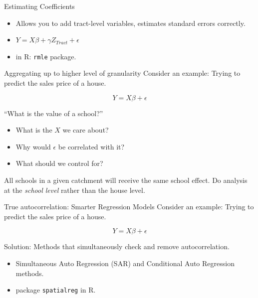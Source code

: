 \documentclass[
  8pt,
  ignorenonframetext,
]{beamer}
\providecommand{\tightlist}{%
  \setlength{\itemsep}{0pt}\setlength{\parskip}{0pt}}
\begin{document}
\begin{frame}[fragile]{Estimating Coefficients}
\begin{itemize}
  \begin{itemize}
  \tightlist
  \item
    Allows you to add tract-level variables, estimates standard errors
    correctly.
  \item
    \(Y = X\beta + \gamma Z_{Tract} + \epsilon\)
  \item
    in R: \texttt{rmle} package.
  \end{itemize}
\end{itemize}
\end{frame}

\begin{frame}{Aggregating up to higher level of granularity}
\protect\hypertarget{aggregating-up-to-higher-level-of-granularity}{}
Consider an example: Trying to predict the sales price of a house.

\[Y = X\beta + \epsilon\]

``What is the value of a school?''

\begin{itemize}
\tightlist
\item
  What is the \(X\) we care about?
\item
  Why would \(\epsilon\) be correlated with it?
\item
  What should we control for?
\end{itemize}

\pause

All schools in a given catchment will receive the same school effect. Do
analysis at the \emph{school level} rather than the house level.
\end{frame}

\begin{frame}[fragile]{True autocorrelation: Smarter Regression Models}
\protect\hypertarget{true-autocorrelation-smarter-regression-models}{}
Consider an example: Trying to predict the sales price of a house.

\[Y = X\beta + \epsilon\]

Solution: Methods that simultaneously check and remove autocorrelation.

\begin{itemize}
\tightlist
\item
  Simultaneous Auto Regression (SAR) and Conditional Auto Regression
  methods.
\item
  package \texttt{spatialreg} in R.
\end{itemize}
\end{frame}
\end{document}
